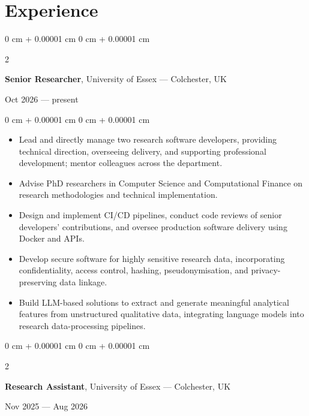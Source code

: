 \documentclass[6pt, letterpaper]{article}
\newenvironment{highlights}{
    \begin{itemize}[
        topsep=0.03 cm,
        parsep=0.03 cm,
        partopsep=0pt,
        itemsep=0pt,
        leftmargin=0 cm + 10pt
    ]
}{
    \end{itemize}
} %
\newenvironment{onecolentry}{
    \begin{adjustwidth}{
        0 cm + 0.00001 cm
    }{
        0 cm + 0.00001 cm
    }
}{
    \end{adjustwidth}
} %
\newenvironment{twocolentry}[2][]{
    \onecolentry
    \def\secondColumn{#2}
    \setcolumnwidth{\fill, 4.5 cm}
    \begin{paracol}{2}
}{
    \switchcolumn \raggedleft \secondColumn
    \end{paracol}
    \endonecolentry
} %
\begin{document}
    \section{Experience}


        \begin{twocolentry}{Oct 2026 --- present}
            \textbf{Senior Researcher}, University of Essex --- Colchester, UK
        \end{twocolentry}

        \begin{onecolentry}
        \begin{highlights}

            \item Lead and directly manage two research software developers, providing technical direction, overseeing delivery, and supporting professional development; mentor colleagues across the department.
            \item Advise PhD researchers in Computer Science and Computational Finance on research methodologies and technical implementation.
            \item Design and implement CI/CD pipelines, conduct code reviews of senior developers' contributions, and oversee production software delivery using Docker and APIs.
            \item Develop secure software for highly sensitive research data, incorporating confidentiality, access control, hashing, pseudonymisation, and privacy-preserving data linkage.
            \item Build LLM-based solutions to extract and generate meaningful analytical features from unstructured qualitative data, integrating language models into research data-processing pipelines.

        \end{highlights}
        \end{onecolentry}

        \begin{twocolentry}{Nov 2025 --- Aug 2026}
            \textbf{Research Assistant}, University of Essex --- Colchester, UK
        \end{twocolentry}
\end{document}
